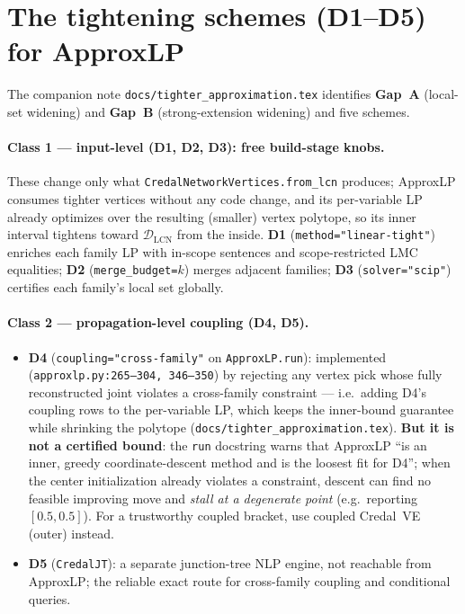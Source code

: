 \documentclass[11pt]{article}
\newcommand{\DLCN}{\mathcal{D}_{\mathrm{LCN}}}
\begin{document}
\section{The tightening schemes (D1--D5) for ApproxLP}\label{sec:schemes}

The companion note \texttt{docs/tighter\_approximation.tex} identifies \textbf{Gap~A} (local-set
widening) and \textbf{Gap~B} (strong-extension widening) and five schemes.

\paragraph{Class 1 --- input-level (D1, D2, D3): free build-stage knobs.} These change only what
\texttt{CredalNetworkVertices.from\_lcn} produces; ApproxLP consumes tighter vertices without any code
change, and its per-variable LP already optimizes over the resulting (smaller) vertex polytope, so
its inner interval tightens toward $\DLCN$ from the inside. \textbf{D1} (\texttt{method="linear-tight"})
enriches each family LP with in-scope sentences and scope-restricted LMC equalities; \textbf{D2}
(\texttt{merge\_budget=$k$}) merges adjacent families; \textbf{D3} (\texttt{solver="scip"}) certifies
each family's local set globally.

\paragraph{Class 2 --- propagation-level coupling (D4, D5).}
\begin{itemize}
  \item \textbf{D4} (\texttt{coupling="cross-family"} on \texttt{ApproxLP.run}): implemented
    (\texttt{approxlp.py:265--304, 346--350}) by rejecting any vertex pick whose fully reconstructed
    joint violates a cross-family constraint --- i.e.\ adding D4's coupling rows to the per-variable LP,
    which keeps the inner-bound guarantee while shrinking the polytope
    (\texttt{docs/tighter\_approximation.tex}). \textbf{But it is not a certified bound}: the
    \texttt{run} docstring warns that ApproxLP ``is an inner, greedy coordinate-descent method and is
    the loosest fit for D4''; when the center initialization already violates a constraint, descent
    can find no feasible improving move and \emph{stall at a degenerate point} (e.g.\ reporting
    $[0.5,0.5]$). For a trustworthy coupled bracket, use coupled Credal~VE (outer) instead.
  \item \textbf{D5} (\texttt{CredalJT}): a separate junction-tree NLP engine, not reachable from
    ApproxLP; the reliable exact route for cross-family coupling and conditional queries.
\end{itemize}
\end{document}
